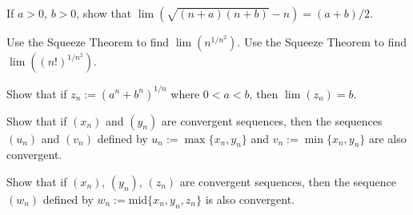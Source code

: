 \documentclass[paper=a4, fontsize=11pt]{scrartcl} %
\numberwithin{equation}{section} %
\numberwithin{figure}{section} %
\numberwithin{table}{section} %
\begin{document}
 If $a > 0$, $b > 0$, show that $\lim\left(\sqrt{(n+a)(n+b)} - n\right) = (a + b)/2$.
\pf

 Use the Squeeze Theorem to find $\lim(n^{1/n^2})$.
\pf
{} Use the Squeeze Theorem to find $\lim((n!)^{1/n^2})$.
\pf

 Show that if $z_n := (a^n + b^n)^{1/n}$ where $0 < a < b$, then $\lim(z_n) = b$.
\pf

 Show that if $(x_n)$ and $(y_n)$ are convergent sequences, then the sequences $(u_n)$ and $(v_n)$ defined by $u_n := \max\{x_n, y_n\}$ and $v_n := \min\{x_n, y_n\}$ are also convergent.
\pf

 Show that if $(x_n)$, $(y_n)$, $(z_n)$ are convergent sequences, then the sequence $(w_n)$ defined by $w_n := \text{mid}\{x_n, y_n, z_n\}$ is also convergent.
\pf
\end{document}
